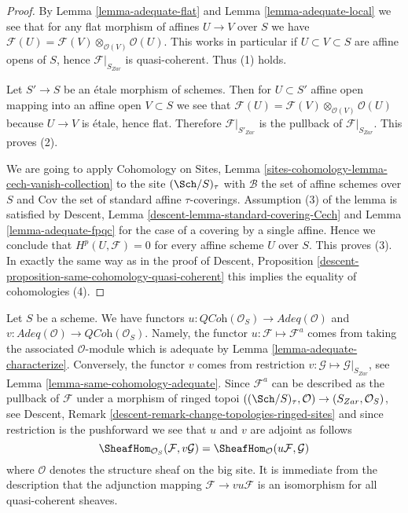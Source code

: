 \begin{proof}
By
Lemma \ref{lemma-adequate-flat}
and
Lemma \ref{lemma-adequate-local}
we see that for any flat morphism of affines $U \to V$ over $S$
we have
$\mathcal{F}(U) = \mathcal{F}(V) \otimes_{\mathcal{O}(V)} \mathcal{O}(U)$.
This works in particular if $U \subset V \subset S$ are affine opens of
$S$, hence $\mathcal{F}|_{S_{Zar}}$ is quasi-coherent.
Thus (1) holds.

\medskip\noindent
Let $S' \to S$ be an \'etale morphism of schemes.
Then for $U \subset S'$ affine open mapping into an affine open
$V \subset S$ we see that
$\mathcal{F}(U) = \mathcal{F}(V) \otimes_{\mathcal{O}(V)} \mathcal{O}(U)$
because $U \to V$ is \'etale, hence flat. Therefore
$\mathcal{F}|_{S'_{Zar}}$ is the pullback of $\mathcal{F}|_{S_{Zar}}$.
This proves (2).

\medskip\noindent
We are going to apply
Cohomology on Sites,
Lemma \ref{sites-cohomology-lemma-cech-vanish-collection}
to the site $(\Sch/S)_\tau$ with
$\mathcal{B}$ the set of affine schemes over $S$ and
$\text{Cov}$ the set of standard affine $\tau$-coverings.
Assumption (3) of the lemma is satisfied by
Descent, Lemma \ref{descent-lemma-standard-covering-Cech}
and
Lemma \ref{lemma-adequate-fpqc}
for the case of a covering by a single affine.
Hence we conclude that $H^p(U, \mathcal{F}) = 0$ for every
affine scheme $U$ over $S$. This proves (3).
In exactly the same way as in the proof of
Descent, Proposition \ref{descent-proposition-same-cohomology-quasi-coherent}
this implies the equality of cohomologies (4).
\end{proof}

\begin{remark}
\label{remark-compare}
Let $S$ be a scheme. We have functors
$u : \textit{QCoh}(\mathcal{O}_S) \to \textit{Adeq}(\mathcal{O})$
and
$v : \textit{Adeq}(\mathcal{O}) \to \textit{QCoh}(\mathcal{O}_S)$.
Namely, the functor $u : \mathcal{F} \mapsto \mathcal{F}^a$
comes from taking the associated $\mathcal{O}$-module which is
adequate by
Lemma \ref{lemma-adequate-characterize}.
Conversely, the functor $v$ comes from restriction
$v : \mathcal{G} \mapsto \mathcal{G}|_{S_{Zar}}$, see
Lemma \ref{lemma-same-cohomology-adequate}.
Since $\mathcal{F}^a$ can be described as the pullback of
$\mathcal{F}$ under a morphism of ringed topoi
$((\Sch/S)_\tau, \mathcal{O}) \to (S_{Zar}, \mathcal{O}_S)$, see
Descent, Remark \ref{descent-remark-change-topologies-ringed-sites}
and since restriction is the pushforward we see that $u$ and $v$
are adjoint as follows
$$
\SheafHom_{\mathcal{O}_S}(\mathcal{F}, v\mathcal{G})
=
\SheafHom_\mathcal{O}(u\mathcal{F}, \mathcal{G})
$$
where $\mathcal{O}$ denotes the structure sheaf on the big site.
It is immediate from the description that the adjunction mapping
$\mathcal{F} \to vu\mathcal{F}$ is an isomorphism for all quasi-coherent
sheaves.
\end{remark}

